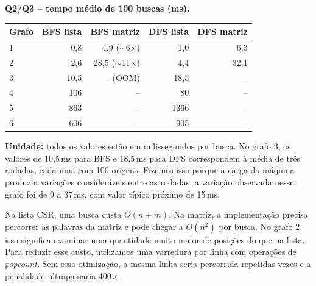 \documentclass[11pt,a4paper]{article}
\begin{document}
\textbf{Q2/Q3 -- tempo m\'edio de 100 buscas (ms).}
\begin{center}\small
\begin{tabular}{lrrrr}
\toprule
Grafo & BFS lista & BFS matriz & DFS lista & DFS matriz \\
\midrule
1 & 0,8 & 4,9 ($\sim$6$\times$) & 1,0 & 6,3 \\
2 & 2,6 & 28,5 ($\sim$11$\times$) & 4,4 & 32,1 \\
3 & 10,5 & -- (OOM) & 18,5 & -- \\
4 & 106 & -- & 80 & -- \\
5 & 863 & -- & 1366 & -- \\
6 & 606 & -- & 905 & -- \\
\bottomrule
\end{tabular}
\end{center}
\textbf{Unidade:} todos os valores est\~ao em milissegundos por busca. No grafo 3, os
valores de 10,5\,ms para BFS e 18,5\,ms para DFS correspondem \`a m\'edia de tr\^es
rodadas, cada uma com 100 origens. Fizemos isso porque a carga da m\'aquina produziu
varia\c c\~oes consider\'aveis entre as rodadas; a varia\c c\~ao observada nesse grafo
foi de 9 a 37\,ms, com valor t\'ipico pr\'oximo de 15\,ms.

Na lista CSR, uma busca custa $O(n+m)$. Na matriz, a implementa\c c\~ao precisa
percorrer as palavras da matriz e pode chegar a $O(n^2)$ por busca. No grafo 2,
isso significa examinar uma quantidade muito maior de posi\c c\~oes do que na lista.
Para reduzir esse custo, utilizamos uma varredura por linha com opera\c c\~oes de
\textit{popcount}. Sem essa otimiza\c c\~ao, a mesma linha seria percorrida repetidas
vezes e a penalidade ultrapassaria 400$\times$.
\end{document}
